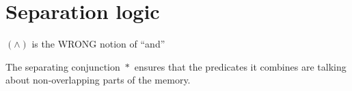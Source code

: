\section{Separation logic}

\begin{frame}{$(\wedge)$ is the WRONG notion of ``and''}

  The separating conjunction $\mathrel{*}$ ensures that the
  predicates it combines are talking about non-overlapping
  parts of the memory.

\end{frame}
